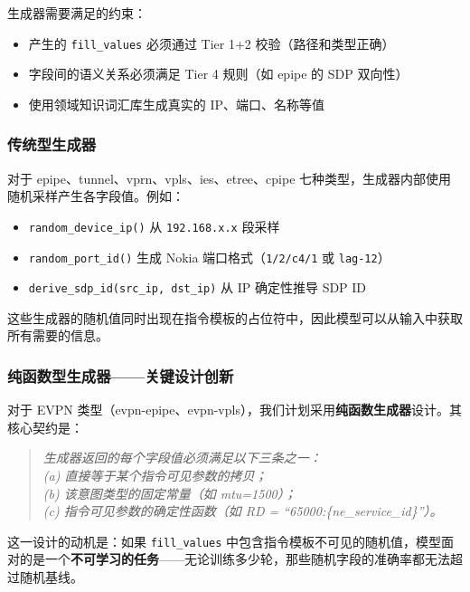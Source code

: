 \documentclass[12pt, a4paper]{article}
\newcommand{\fillvalues}{\texttt{fill\_values}}
\begin{document}
\noindent
生成器需要满足的约束：

\begin{itemize}
  \item 产生的 \fillvalues{} 必须通过 Tier 1+2 校验（路径和类型正确）
  \item 字段间的语义关系必须满足 Tier 4 规则（如 epipe 的 SDP 双向性）
  \item 使用领域知识词汇库生成真实的 IP、端口、名称等值
\end{itemize}

\subsubsection{传统型生成器}

对于 epipe、tunnel、vprn、vpls、ies、etree、cpipe 七种类型，生成器内部使用随机采样产生各字段值。例如：

\begin{itemize}
  \item \texttt{random\_device\_ip()} 从 \texttt{192.168.x.x} 段采样
  \item \texttt{random\_port\_id()} 生成 Nokia 端口格式（\texttt{1/2/c4/1} 或 \texttt{lag-12}）
  \item \texttt{derive\_sdp\_id(src\_ip, dst\_ip)} 从 IP 确定性推导 SDP ID
\end{itemize}

这些生成器的随机值同时出现在指令模板的占位符中，因此模型可以从输入中获取所有需要的信息。

\subsubsection{纯函数型生成器——关键设计创新}
\label{sec:pure-function}

对于 EVPN 类型（evpn-epipe、evpn-vpls），我们计划采用\textbf{纯函数生成器}设计。其核心契约是：

\begin{quote}
\itshape
生成器返回的每个字段值必须满足以下三条之一：\\
(a) 直接等于某个指令可见参数的拷贝；\\
(b) 该意图类型的固定常量（如 mtu=1500）；\\
(c) 指令可见参数的确定性函数（如 RD = ``65000:\{ne\_service\_id\}''）。
\end{quote}

\noindent
这一设计的动机是：如果 \fillvalues{} 中包含指令模板不可见的随机值，模型面对的是一个\textbf{不可学习的任务}——无论训练多少轮，那些随机字段的准确率都无法超过随机基线。
\end{document}
